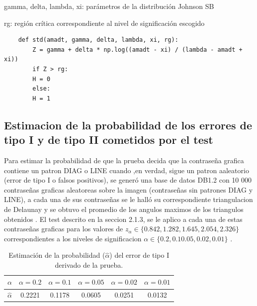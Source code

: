 \documentclass[12pt]{report}
\begin{document}
	gamma, delta, lambda, xi: parámetros de la distribución Johnson SB
	
	rg: región crítica correspondiente al nivel de significación escogido
	
	
	\begin{lstlisting}
	def std(amadt, gamma, delta, lambda, xi, rg):
		Z = gamma + delta * np.log((amadt - xi) / (lambda - amadt + xi))
		if Z > rg:
		H = 0
		else:
		H = 1
	\end{lstlisting}
	
	
\subsection{Estimacion de la probabilidad de los errores de tipo I y de tipo II  cometidos por el test}	 

	Para estimar la probabilidad de que la prueba decida que la contraseña grafica contiene un patron DIAG o LINE cuando ,en verdad, sigue un patron aaleatorio (error de tipo I o falsos positivos), se generó una base de datos DB1.2 con 10 000 contraseñas graficas aleatoreas sobre la imagen (contraseñas sin patrones DIAG y LINE), a cada una de sus contraseñas se le halló su correspondiente triangulacion de Delaunay y se obtuvo el promedio de los angulos maximos de los triangulos obtenidos . El test descrito en la seccion 2.1.3, se le aplico a cada una de estas contraseñas graficas para los valores de $z_\alpha \in \{0.842, 1.282, 1.645, 2.054, 2.326\}$ correspondientes a los niveles de significacion $\alpha \in \{0.2, 0.1 0.05, 0.02 , 0.01\}$ .
	
\begin{table}[h!]
	\centering
	\begin{tabular}{|c|ccccc|}
		\hline
		$\alpha$ & $\alpha = 0.2$ & $\alpha = 0.1$ & $\alpha = 0.05$ & $\alpha = 0.02$ & $\alpha = 0.01$ \\
		\hline
		$\hat{\alpha}$ & 0.2221 & 0.1178 & 0.0605 & 0.0251 & 0.0132 \\
		\hline
	\end{tabular}
	\caption{Estimación de la probabilidad ($\hat{\alpha}$) del error de tipo I derivado de la prueba.}
	\label{tab:error1-prob}
\end{table}
\end{document}
